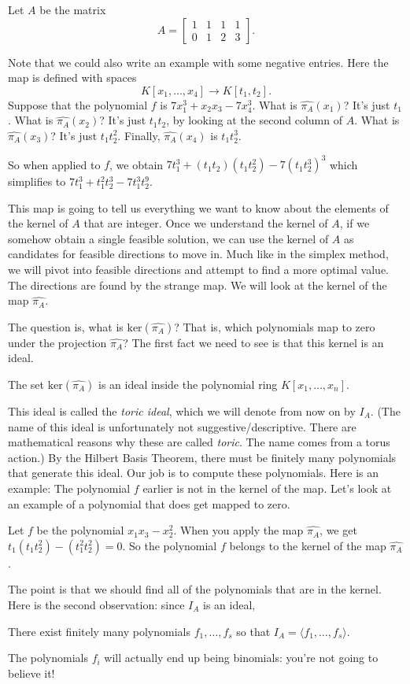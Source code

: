 \begin{example}
Let $A$ be the matrix
\[ A = \left[
\begin{array}{cccc}
1 & 1& 1& 1\\ 0 & 1& 2& 3
\end{array}
\right].\]

Note that we could also write an example with some negative entries. Here the map is defined with spaces
\[ K[x_1,\ldots,x_4] \rightarrow K[t_1,t_2]. \]
Suppose that the polynomial $f$ is $7 x_1^3 + x_2 x_3 - 7 x_4^3$.
What is $\widehat{\pi_A}(x_1)$? It's just $t_1$.
What is $\widehat{\pi_A}(x_2)$? It's just $t_1t_2$, by looking at the second column of $A$.
What is $\widehat{\pi_A}(x_3)$? It's just $t_1t_2^2$.
Finally, $\widehat{\pi_A}(x_4)$ is $t_1t_2^3$.

So when applied to $f$, we obtain $7 t_1^3 + (t_1t_2)(t_1t_2^2) - 7(t_1t_2^3)^3$ which simplifies to $7 t_1^3 + t_1^2 t_2^3 - 7 t_1^3 t_2^9$.
\end{example}
This map is going to tell us everything we want to know about the elements of the kernel of $A$ that are integer. Once we understand the kernel of $A$, if we somehow obtain a single feasible solution, we can use the kernel of $A$ as candidates for feasible directions to move in.  Much like in the simplex method, we will pivot into feasible directions and attempt to find a more optimal value. The directions are found by the strange map. We will look at the kernel of the map $\widehat{\pi_A}$.

The question is, what is $\text{ker}(\widehat{\pi_A})$? That is, which polynomials map to zero under the projection $\widehat{\pi_A}$? The first fact we need to see is that this kernel is an ideal.
\begin{lemma}{}{}
The set $\text{ker}(\widehat{\pi_A})$ is an ideal inside the polynomial ring $K[x_1,\ldots,x_n]$.
\end{lemma}
This ideal is called the \textit{toric ideal}, which we will denote from now on by $I_A$. (The name of this ideal is unfortunately not suggestive/descriptive. There are mathematical reasons why these are called \emph{toric}. The name comes from a torus action.) By the Hilbert Basis Theorem, there must be finitely many polynomials that generate this ideal. Our job is to compute these polynomials. Here is an example: The polynomial $f$ earlier is not in the kernel of the map. Let's look at an example of a polynomial that does get mapped to zero.
\begin{example}{}{}
Let $f$ be the polynomial $x_1 x_3 - x_2^2$. When you apply the map $\widehat{\pi_A}$, we get $t_1(t_1 t_2^2) - (t_1^2 t_2^2) = 0$. So the polynomial $f$ belongs to the kernel of the map $\widehat{\pi_A}$.
\end{example}
The point is that we should find all of the polynomials that are in the kernel. Here is the second observation: since $I_A$ is an ideal,
\begin{lemma}{}{}
There exist finitely many polynomials $f_1, \ldots, f_s$ so that $I_A = \langle f_1,\ldots, f_s \rangle$.
\end{lemma}
The polynomials $f_i$ will actually end up being binomials: you're not going to believe it!

